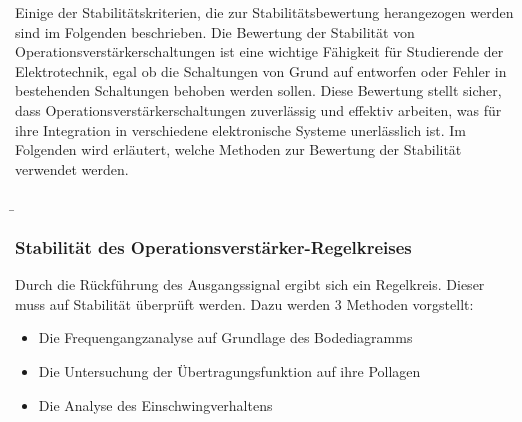 \begin{frame}
{        Einige der Stabilitätskriterien, die zur Stabilitätsbewertung herangezogen werden sind im Folgenden beschrieben.
        Die Bewertung der Stabilität von Operationsverstärkerschaltungen ist eine wichtige Fähigkeit für Studierende der Elektrotechnik, egal ob die Schaltungen von Grund auf entworfen oder Fehler in bestehenden Schaltungen behoben werden sollen.
        Diese Bewertung stellt sicher, dass Operationsverstärkerschaltungen zuverlässig und effektiv arbeiten, was für ihre Integration in verschiedene elektronische Systeme unerlässlich ist. Im Folgenden wird erläutert, welche Methoden zur Bewertung der Stabilität verwendet werden.
    }

    \b{
        \frametitle{Stabilität des Operationsverstärker-Regelkreises}
        Durch die Rückführung des Ausgangssignal ergibt sich ein Regelkreis. Dieser muss auf Stabilität überprüft werden. Dazu werden 3 Methoden vorgstellt:
        \begin{itemize}
            \item Die Frequengangzanalyse auf Grundlage des Bodediagramms
            \item Die Untersuchung der Übertragungsfunktion auf ihre Pollagen
            \item Die Analyse des Einschwingverhaltens
        \end{itemize}
    }
\end{frame}

